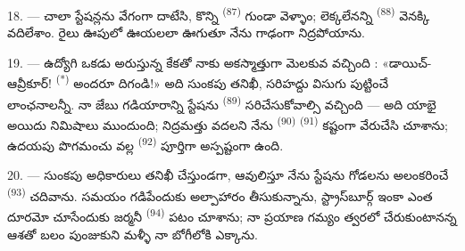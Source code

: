 18. --- చాలా స్టేషన్లను వేగంగా దాటేసి, కొన్ని  \textsuperscript{(87)}
గుండా వెళ్ళాం;  లెక్కలేనన్ని 
\textsuperscript{(88)} వెనక్కి వదిలేశాం. రైలు ఊపులో ఊయలలా ఊగుతూ నేను గాఢంగా
నిద్రపోయాను.

\VUsaut{3.0mm}
\VUsaut{3.0mm}

19. --- ఉద్యోగి ఒకడు అరుస్తున్న కేకతో నాకు అకస్మాత్తుగా మెలకువ వచ్చింది :
«డాయిచ్-ఆవ్రీకూర్! \textsuperscript{(*)} అందరూ దిగండి!» అది సుంకపు తనిఖీ, సరిహద్దు
విసుగు పుట్టించే లాంఛనాలన్నీ. నా జేబు గడియారాన్ని స్టేషను 
\textsuperscript{(89)} సరిచేసుకోవాల్సి వచ్చింది — అది యాభై అయిదు నిమిషాలు ముందుంది;
నిద్రమత్తు వదలని నేను  \textsuperscript{(90)}
 \textsuperscript{(91)} కష్టంగా వేరుచేసి చూశాను; ఉదయపు పొగమంచు
వల్ల  \textsuperscript{(92)} పూర్తిగా అస్పష్టంగా ఉంది.

20. --- సుంకపు అధికారులు తనిఖీ చేస్తుండగా, ఆవులిస్తూ నేను స్టేషను గోడలను అలంకరించే
 \textsuperscript{(93)} చదివాను. సమయం గడిపేందుకు అల్పాహారం
తీసుకున్నాను, స్ట్రాస్‌బూర్గ్ ఇంకా ఎంత దూరమో చూసేందుకు జర్మనీ 
\textsuperscript{(94)} పటం చూశాను; నా ప్రయాణ గమ్యం త్వరలో చేరుకుంటానన్న ఆశతో బలం
పుంజుకుని మళ్ళీ నా బోగీలోకి ఎక్కాను.

\VUsaut{6.0mm}
\VUfilet{22mm}
